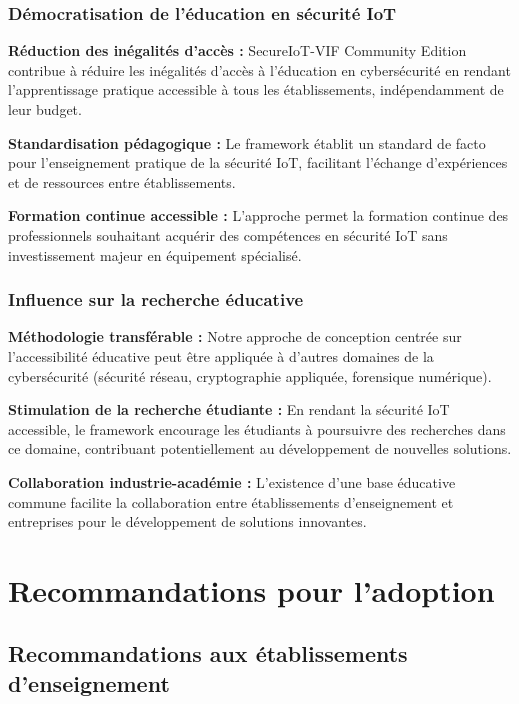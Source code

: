 \subsubsection{Démocratisation de l'éducation en sécurité IoT}

\textbf{Réduction des inégalités d'accès :} SecureIoT-VIF Community Edition contribue à réduire les inégalités d'accès à l'éducation en cybersécurité en rendant l'apprentissage pratique accessible à tous les établissements, indépendamment de leur budget.

\textbf{Standardisation pédagogique :} Le framework établit un standard de facto pour l'enseignement pratique de la sécurité IoT, facilitant l'échange d'expériences et de ressources entre établissements.

\textbf{Formation continue accessible :} L'approche permet la formation continue des professionnels souhaitant acquérir des compétences en sécurité IoT sans investissement majeur en équipement spécialisé.

\subsubsection{Influence sur la recherche éducative}

\textbf{Méthodologie transférable :} Notre approche de conception centrée sur l'accessibilité éducative peut être appliquée à d'autres domaines de la cybersécurité (sécurité réseau, cryptographie appliquée, forensique numérique).

\textbf{Stimulation de la recherche étudiante :} En rendant la sécurité IoT accessible, le framework encourage les étudiants à poursuivre des recherches dans ce domaine, contribuant potentiellement au développement de nouvelles solutions.

\textbf{Collaboration industrie-académie :} L'existence d'une base éducative commune facilite la collaboration entre établissements d'enseignement et entreprises pour le développement de solutions innovantes.

\section{Recommandations pour l'adoption}

\subsection{Recommandations aux établissements d'enseignement}


